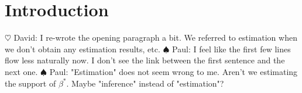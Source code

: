 \documentclass[aos]{imsart}
\theoremstyle{plain}
\newcommand{\david}[1]{{\small{\color{blue} \sf $\heartsuit$ David: #1}}}
\newcommand{\paul}[1]{{\small{\color{green} \sf $\spadesuit$ Paul: #1}}}
\begin{document}
\begin{frontmatter}
\begin{abstract}
Vestibulum rhoncus pretium ex, egestas facilisis neque efficitur quis. Morbi malesuada volutpat erat, sed aliquet lectus dictum ac. Aenean ligula massa, consequat a blandit id, placerat.
\end{abstract}

\begin{keyword}[class=MSC]
\end{keyword}

\begin{keyword}
\end{keyword}

\end{frontmatter}






\section{Introduction} 

\david{I re-wrote the opening paragraph a bit. We referred to estimation when we don't obtain any estimation results, etc.} \paul{I feel like the first few lines flow less naturally now. I don't see the link between the first sentence and the next one.} \paul{"Estimation" does not seem wrong to me. Aren't we estimating the support of $\beta^*$. Maybe "inference" instead of "estimation"?}
\end{document}
